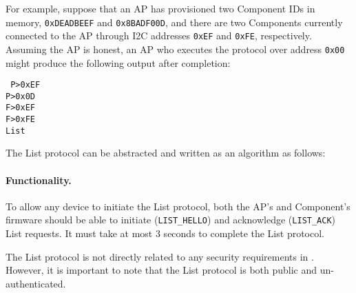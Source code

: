 For example, suppose that an AP has provisioned two Component IDs in memory, \texttt{0xDEADBEEF} and \texttt{0x8BADF00D}, and there are two Components currently connected to the AP through I2C addresses \texttt{0xEF} and \texttt{0xFE}, respectively. Assuming the AP is honest, an AP who executes the protocol over address \texttt{0x00} might produce the following output after completion:

\texttt{%
P>0xEF\\
P>0x0D\\
F>0xEF\\
F>0xFE\\
List
}

The List protocol can be abstracted and written as an algorithm as follows:
\begin{pcimage}
\end{pcimage}

\paragraph{Functionality.} To allow any device to initiate the List protocol, both the AP's and Component's firmware should be able to initiate (\texttt{LIST\_HELLO}) and acknowledge (\texttt{LIST\_ACK}) List requests. It must take at most 3 seconds to complete the List protocol.

The List protocol is not directly related to any security requirements in . However, it is important to note that the List protocol is both public and un-authenticated.
